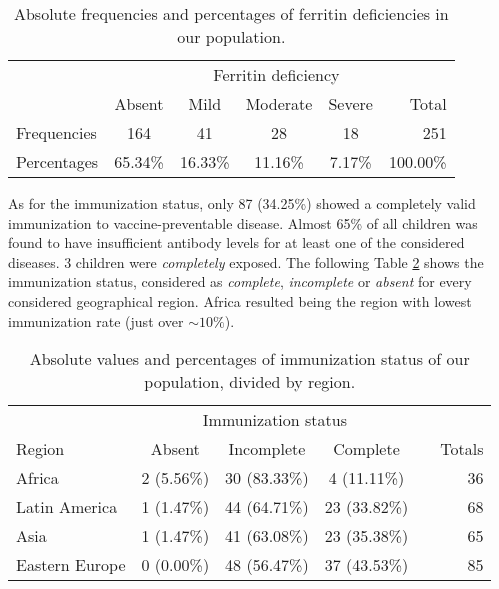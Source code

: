 \begin{table}[H]
   \centering
   \begin{tabular}{l c c c c | r}
   	  & & \multicolumn{3}{c}{Ferritin deficiency} & \\
   	 \cline{3-5}
       & Absent & Mild & Moderate & Severe & Total\\
      \hline
      Frequencies & 164 & 41 & 28 & 18 & 251\\
      Percentages & 65.34\% & 16.33\% & 11.16\% & 7.17\% & 100.00\%\\
   \end{tabular}
   \caption{Absolute frequencies and percentages of ferritin deficiencies in our population.}
    \label{tab:ferritinpatfreq}
\end{table}

As for the immunization status, only 87 (34.25\%) showed a completely valid immunization to vaccine-preventable disease. Almost 65\% of all children was found to have insufficient antibody levels for at least one of the considered diseases. 3 children were \textit{completely} exposed. The following Table \ref{tab:immunizationperregion} shows the immunization status, considered as \textit{complete}, \textit{incomplete} or \textit{absent} for every considered geographical region. Africa resulted being the region with lowest immunization rate (just over $\sim 10\%$).

\begin{table}[H]
   \centering
   \begin{tabular}{l c c c c | r}
   	  & \multicolumn{3}{c}{Immunization status} & \\
   	 \cline{2-4}
      Region\footnotemark[1] & Absent & Incomplete & Complete & & Totals\\
      \hline
      Africa & 2 (5.56\%) & 30 (83.33\%) & 4 (11.11\%) & & 36\\
      Latin America & 1 (1.47\%) & 44 (64.71\%) & 23 (33.82\%) & & 68\\
      Asia & 1 (1.47\%) & 41 (63.08\%) & 23 (35.38\%) & & 65\\
      Eastern Europe & 0 (0.00\%) & 48 (56.47\%) & 37 (43.53\%) & & 85\\
   \end{tabular}
   \caption{Absolute values and percentages of immunization status of our population, divided by region.}
    \label{tab:immunizationperregion}
\end{table}

